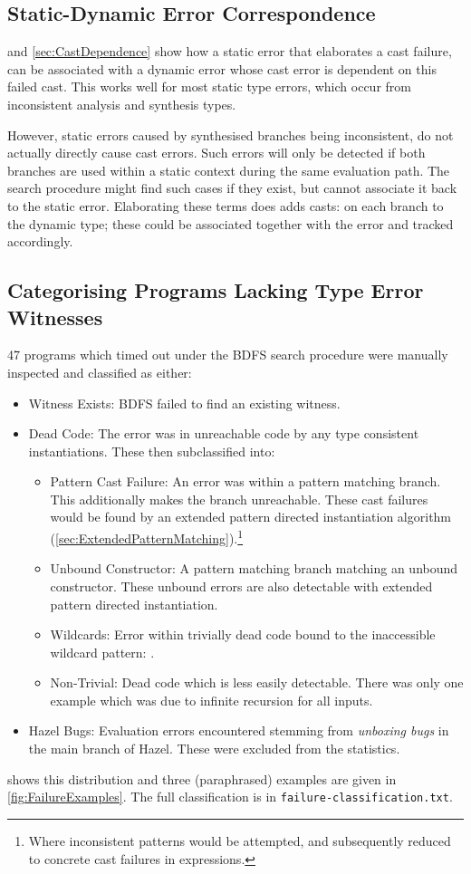 \subsection{Static-Dynamic Error Correspondence}
 and \ref{sec:CastDependence} show how a static error that elaborates a cast failure, can be associated with a dynamic error whose cast error is dependent on this failed cast. This works well for most static type errors, which occur from inconsistent analysis and synthesis types.

However, static errors caused by synthesised branches being inconsistent, do not actually directly cause cast errors. Such errors will only be detected if both branches are used within a static context during the same evaluation path. The search procedure might find such cases if they exist, but cannot associate it back to the static error. Elaborating these terms does adds casts: on each branch to the dynamic type; these could be associated together with the error and tracked accordingly. 
  
\subsection{Categorising Programs Lacking Type Error Witnesses}
47 programs which timed out under the BDFS search procedure were manually inspected and classified as either:
\begin{itemize}
\item Witness Exists: BDFS failed to find an existing witness.
\item Dead Code: The error was in unreachable code by any type consistent instantiations. These then subclassified into:
\begin{itemize}
\item Pattern Cast Failure: An error was within a pattern matching branch. This additionally makes the branch unreachable. These cast failures would be found by an extended pattern directed instantiation algorithm (\cref{sec:ExtendedPatternMatching}).\footnote{Where inconsistent patterns would be attempted, and subsequently reduced to concrete cast failures in expressions.}
\item Unbound Constructor: A pattern matching branch matching an unbound constructor. These unbound errors are also detectable with extended pattern directed instantiation.
\item Wildcards: Error within trivially dead code bound to the inaccessible wildcard pattern: .
\item Non-Trivial: Dead code which is less easily detectable. There was only one example which was due to infinite recursion for all inputs.
\end{itemize}
\item Hazel Bugs: Evaluation errors encountered stemming from \textit{unboxing bugs} in the main branch of Hazel. These were excluded from the statistics.
\end{itemize}
 shows this distribution and three (paraphrased) examples are given in \cref{fig:FailureExamples}. The full classification is in \texttt{failure-classification.txt}.

